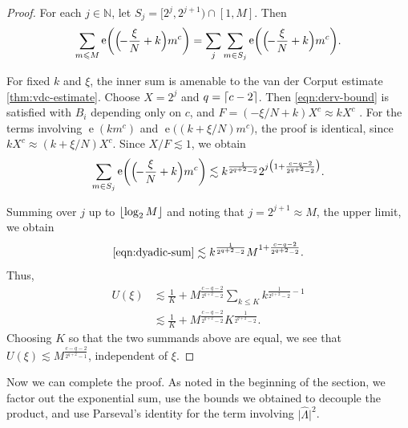 \documentclass[letterpaper, 12pt]{article}
\theoremstyle{plain}
\theoremstyle{definition}
\theoremstyle{plain}
\theoremstyle{plain}
\numberwithin{equation}{section}
\newcommand{\N}{\mathbb{N}}
\renewcommand{\leq}{\leqslant}
\newcommand{\1}{\textbf{1}}
\DeclarePairedDelimiter\ceil{\lceil}{\rceil}
\DeclarePairedDelimiter\floor{\lfloor}{\rfloor}
\DeclareMathOperator{\e}{e}
\begin{document}
\begin{proof}
    For each $j \in \N$, let $S_j = [2^{j}, 2^{j + 1}) \cap [1, M]$. Then 
    \begin{equation}\label{eqn:dyadic-sum}
        \sum_{m \leq M} \e\biggl(\Bigl(\! -\frac{\xi}{N} + k \Bigr) m^c \biggr) 
        = \sum_j \sum_{m \in S_j} \e\biggl(\Bigl(\! -\frac{\xi}{N} + k \Bigr) m^c \biggr).
    \end{equation}

    For fixed $k$ and $\xi$, the inner sum is amenable to the van der Corput estimate \cref{thm:vdc-estimate}. Choose $X = 2^j$ and $q = \ceil{c - 2}$. Then \cref{eqn:derv-bound} is satisfied with $B_i$ depending only on $c$, and $F = (-\xi/N + k) X^c \approx kX^c$ . For the terms involving $\e(km^c)$ and $\e\bigl((k + \xi/N) m^c\bigr)$, the proof is identical, since $kX^c \approx (k + \xi/N) X^c$.
    Since \(X/F \lesssim 1\), we obtain
    \begin{equation*}
        \sum_{m \in S_j} \e\biggl(\Bigl(\! -\frac{\xi}{N} + k \Bigr) m^c \biggr)
        \lesssim k^\frac{1}{2^{q + 2} -2 } 2^{j \bigl(1 + \frac{c - q - 2}{2^{q + 2} - 2} \bigr)}.
    \end{equation*}
    
    Summing over $j$ up to $\floor*{\log_2 M}$ and noting that $j = 2^{j + 1} \approx M$, the upper limit, we obtain 
    \begin{equation*}
        \eqref{eqn:dyadic-sum} \lesssim k^{\frac{1}{2^{q + 2} - 2}} M^{1 + \frac{c - q - 2}{2^{q + 2} - 2}}.
    \end{equation*}
    Thus,
    \begin{align*}
        U(\xi) &\lesssim \frac{1}{K} + M^{\frac{c - q - 2}{2^{q + 2} - 2}} \sum_{k \leq K} k^{\frac{1}{2^{q + 2} - 2} - 1}\\
        &\lesssim \frac{1}{K} + M^{\frac{c - q - 2}{2^{q + 2} - 2}}K^{\frac{1}{2^{q + 2} - 2}}.
    \end{align*}
    Choosing $K$ so that the two summands above are equal, we see that $U(\xi) \lesssim M^\frac{c - q - 2}{2^{q + 2} - 1}$, independent of $\xi$.
\end{proof}

Now we can complete the proof. As noted in the beginning of the section, we factor out the exponential sum, use the bounds we obtained to decouple the product, and use Parseval's identity for the term involving $\lvert\hat{\Lambda}\rvert^2$.
\end{document}
